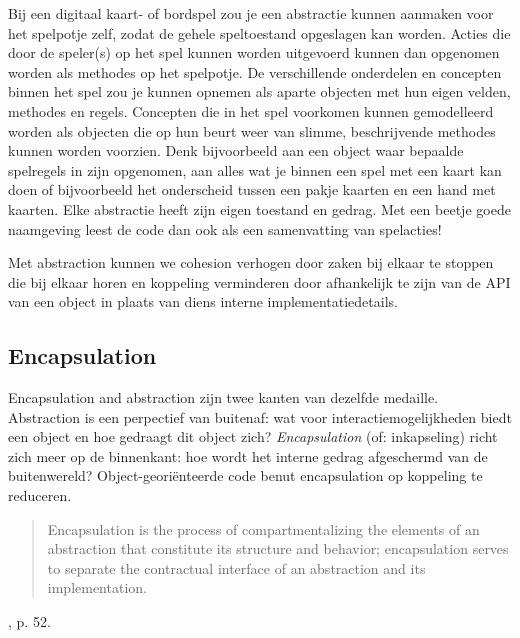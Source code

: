 Bij een digitaal kaart- of bordspel zou je een abstractie kunnen 
aanmaken voor het spelpotje zelf, zodat de gehele speltoestand 
opgeslagen kan worden. Acties die door de speler(s) op het spel 
kunnen worden uitgevoerd kunnen dan opgenomen worden als methodes
op het spelpotje. De verschillende onderdelen en concepten binnen 
het spel zou je kunnen opnemen als aparte objecten met hun eigen 
velden, methodes en regels. Concepten die in het spel voorkomen 
kunnen gemodelleerd worden als objecten die op hun beurt weer 
van slimme, beschrijvende methodes kunnen worden voorzien. 
Denk bijvoorbeeld aan een object 
waar bepaalde spelregels in zijn opgenomen, aan alles wat je binnen 
een spel met een kaart kan doen of bijvoorbeeld het onderscheid tussen 
een pakje kaarten en een hand met kaarten. Elke abstractie heeft zijn 
eigen toestand en gedrag. Met een beetje goede naamgeving leest 
de code dan ook als een samenvatting van spelacties!

Met abstraction kunnen we cohesion verhogen door zaken 
bij elkaar te stoppen die bij elkaar 
horen en koppeling verminderen door afhankelijk te zijn van de 
API van een object in plaats van diens interne implementatiedetails.

\subsection{Encapsulation}
Encapsulation and abstraction zijn twee kanten van dezelfde 
medaille. Abstraction is een perpectief van buitenaf: 
wat voor interactiemogelijkheden biedt een object 
en hoe gedraagt dit object zich?
\textit{Encapsulation} (of: inkapseling) 
richt zich meer op de binnenkant:
hoe wordt het interne gedrag afgeschermd van de 
buitenwereld? Object-georiënteerde code benut 
encapsulation op koppeling te reduceren.

\blockquote{Encapsulation is the process 
of compartmentalizing the elements of an 
abstraction that constitute its structure and 
behavior; encapsulation serves to separate the
contractual interface of an abstraction and its 
implementation.}{\cite{Booch2007}, p. 52.}

